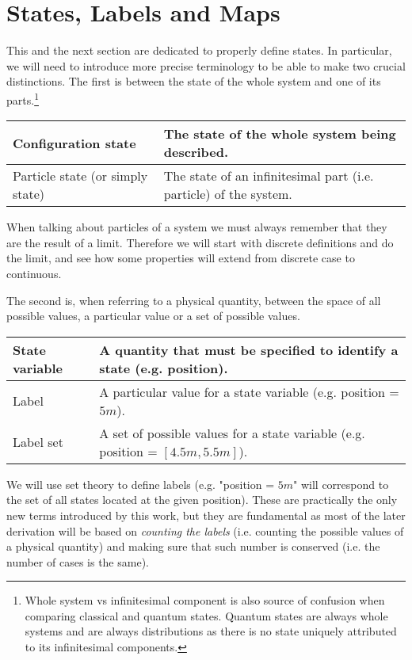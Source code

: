 \documentclass[aps,pra,10pt,twocolumn,floatfix,nofootinbib]{revtex4-1}
\theoremstyle{definition}
\begin{document}
\section{States, Labels and Maps}

This and the next section are dedicated to properly define states. In particular, we will need to introduce more precise terminology to be able to make two crucial distinctions. The first is between the state of the whole system and one of its parts.\footnote{Whole system vs infinitesimal component is also source of confusion when comparing classical and quantum states. Quantum states are always whole systems and are always distributions as there is no state uniquely attributed to its infinitesimal components.}
\begin{center}
    \begin{tabular}{ | p{2.5cm} | p{5.5cm} | }
    \hline
    Configuration state & The state of the whole system being described. \\ \hline
    Particle state (or simply state) & The state of an infinitesimal part (i.e. particle) of the system. \\ \hline
    \end{tabular}
\end{center}
When talking about particles of a system we must always remember that they are the result of a limit. Therefore we will start with discrete definitions and do the limit, and see how some properties will extend from discrete case to continuous.

The second is, when referring to a physical quantity, between the space of all possible values, a particular value or a set of possible values.
\begin{center}
    \begin{tabular}{ | p{2.5cm} | p{5.5cm} | }
    \hline
    State variable & A quantity that must be specified to identify a state (e.g. position). \\ \hline
    Label & A particular value for a state variable (e.g. position = $5m$). \\ \hline
    Label set & A set of possible values for a state variable (e.g. position = $[4.5m, 5.5m]$). \\
    \hline
    \end{tabular}
\end{center}
We will use set theory to define labels (e.g. "position = $5m$" will correspond to the set of all states located at the given position).
These are practically the only new terms introduced by this work, but they are fundamental as most of the later derivation will be based on \emph{counting the labels} (i.e. counting the possible values of a physical quantity) and making sure that such number is conserved (i.e. the number of cases is the same).
\end{document}
